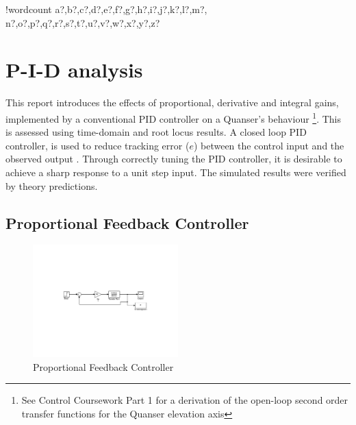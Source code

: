 \documentclass[11pt]{article}
\newcounter{words}
\newenvironment{counted}{%
  \setcounter{words}{0}
  \SearchList!{wordcount}{\stepcounter{words}}
    {a?,b?,c?,d?,e?,f?,g?,h?,i?,j?,k?,l?,m?,
    n?,o?,p?,q?,r?,s?,t?,u?,v?,w?,x?,y?,z?}
  \UndoBoundary{'}
  \SearchOrder{p;}}{%
  \StopSearching}
\begin{document}
\clearpage
{}
\begin{counted} %
\section{P-I-D analysis}\label{p-i-d-analysis}

This report introduces the effects of proportional, derivative and
integral gains, implemented by a conventional PID controller on a
Quanser's behaviour
\footnote{See Control Coursework Part 1 for a derivation of the open-loop second order transfer functions for the Quanser elevation axis}.
This is assessed using time-domain and root locus results. A closed loop
PID controller, is used to reduce tracking error (\(e\)) between the
control input and the observed output \cite{ControlT54:online}. Through
correctly tuning the PID controller, it is desirable to achieve a sharp
response to a unit step input. The simulated results were verified by
theory predictions.

\subsection{Proportional Feedback
Controller}\label{proportional-feedback-controller}

\begin{figure}
\centering
\vspace{-35pt} %
\includegraphics[trim = 0 0 0 0, clip, width=0.5\textwidth]{Psim.pdf}
\vspace{-25pt}
\caption{Proportional Feedback Controller}
\label{Psim}
\vspace{-15pt}
\end{figure}


\end{counted}
\end{document}
